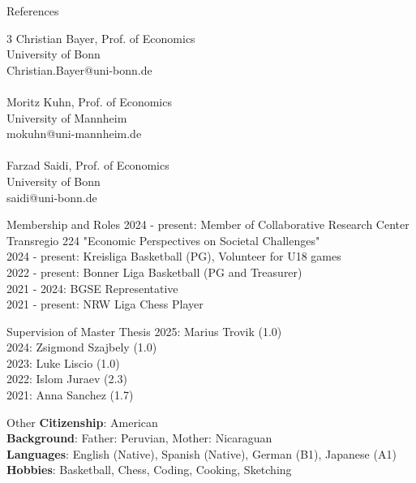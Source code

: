 \documentclass{resume}[10pt] %
\begin{document}
\footnotesize
\begin{rSection}{References}
\setlength{\columnsep}{25pt}
\begin{multicols}{3}
Christian Bayer, Prof. of Economics\\
 University of Bonn \\
  Christian.Bayer@uni-bonn.de \\\\
  Moritz Kuhn, Prof. of Economics\\
 University of Mannheim \\
  mokuhn@uni-mannheim.de \\\\
  Farzad Saidi, Prof. of Economics\\
 University of Bonn \\
  saidi@uni-bonn.de
\end{multicols}
\end{rSection}

\footnotesize
\begin{rSection}{Membership and Roles}
2024 - present: Member of Collaborative Research Center Transregio 224 "Economic Perspectives on Societal Challenges" \\
2024 - present: Kreisliga Basketball (PG), Volunteer for U18 games\\
2022 - present: Bonner Liga Basketball (PG and Treasurer)\\
2021 - 2024: BGSE Representative \\
2021 - present: NRW Liga Chess Player
\end{rSection}
\begin{rSection}{Supervision of Master Thesis}
2025: Marius Trovik (1.0)\\
2024: Zsigmond Szajbely (1.0) \\
2023: Luke Liscio (1.0)\\
2022: Islom Juraev (2.3)\\
2021: Anna Sanchez (1.7)
\end{rSection}

\begin{rSection}{Other}
\textbf{Citizenship}: American \\
\textbf{Background}: Father: Peruvian, Mother: Nicaraguan \\
\textbf{Languages}: English (Native), Spanish (Native), German (B1), Japanese (A1) \\ \textbf{Hobbies}: Basketball, Chess, Coding, Cooking, Sketching
\end{rSection}
\end{document}
